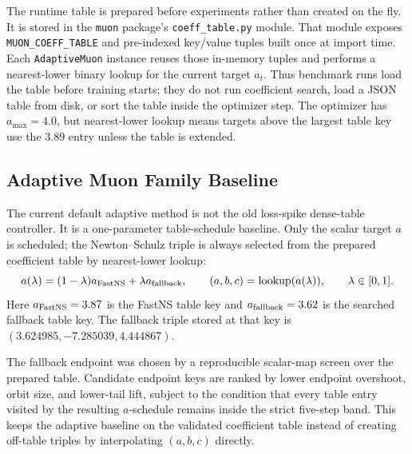 \documentclass[11pt]{article}
\begin{document}
The runtime table is prepared before experiments rather than created on the fly.
It is stored in the \texttt{muon} package's \texttt{coeff\_table.py} module.
That module exposes \texttt{MUON\_COEFF\_TABLE} and pre-indexed key/value tuples
built once at import time. Each \texttt{AdaptiveMuon} instance reuses those
in-memory tuples and performs a nearest-lower binary lookup for the current
target $a_t$. Thus benchmark runs load the table before training starts; they do
not run coefficient search, load a JSON table from disk, or sort the table inside
the optimizer step. The optimizer has $a_{\max}=4.0$, but nearest-lower lookup
means targets above the largest table key use the $3.89$ entry unless the table
is extended.

\subsection{Adaptive Muon Family Baseline}

The current default adaptive method is not the old loss-spike dense-table
controller. It is a one-parameter table-schedule baseline. Only the scalar target
$a$ is scheduled; the Newton--Schulz triple is always selected from the prepared
coefficient table by nearest-lower lookup:
\begin{equation}
    a(\lambda) = (1-\lambda)a_{\rm FastNS} + \lambda a_{\rm fallback},
    \qquad (a,b,c) = \mathrm{lookup}(a(\lambda)),
    \qquad \lambda\in[0,1].
\end{equation}
Here $a_{\rm FastNS}=3.87$ is the FastNS table key and
$a_{\rm fallback}=3.62$ is the searched fallback table key. The fallback triple
stored at that key is $(3.624985,-7.285039,4.444867)$.

The fallback endpoint was chosen by a reproducible scalar-map screen over the
prepared table. Candidate endpoint keys are ranked by lower endpoint overshoot,
orbit size, and lower-tail lift, subject to the condition that every table entry
visited by the resulting $a$-schedule remains inside the strict five-step band.
This keeps the adaptive baseline on the validated coefficient table instead of
creating off-table triples by interpolating $(a,b,c)$ directly.
\end{document}
